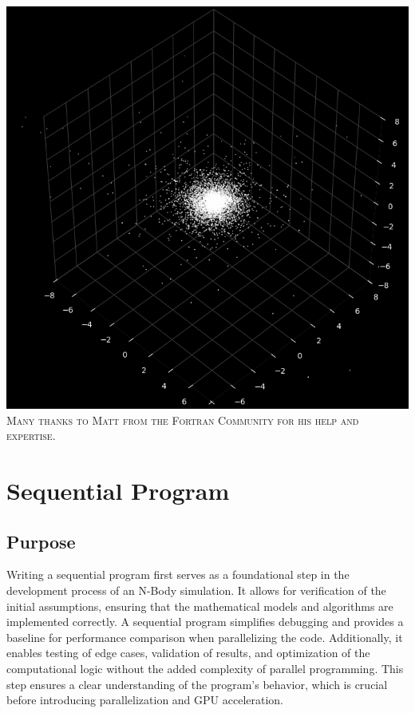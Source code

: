 \documentclass[english,11pt]{article}
\begin{document}
\begin{titlepage}
\begin{center}
        \vfill
        \includegraphics[scale=0.5]{front.png}\\
        \vfill
        \large
        \textsc{\small Many thanks to Matt from the Fortran Community for his help and expertise.}\\[1cm]

    \end{center}
\end{titlepage}

\newpage
\tableofcontents
\newpage





\section{Sequential Program}

\subsection{Purpose}
Writing a sequential program first serves as a foundational step in the development process of an N-Body simulation. It allows for verification of the initial assumptions, ensuring that the mathematical models and algorithms are implemented correctly. A sequential program simplifies debugging and provides a baseline for performance comparison when parallelizing the code. Additionally, it enables testing of edge cases, validation of results, and optimization of the computational logic without the added complexity of parallel programming. This step ensures a clear understanding of the program's behavior, which is crucial before introducing parallelization and GPU acceleration.
\end{document}

